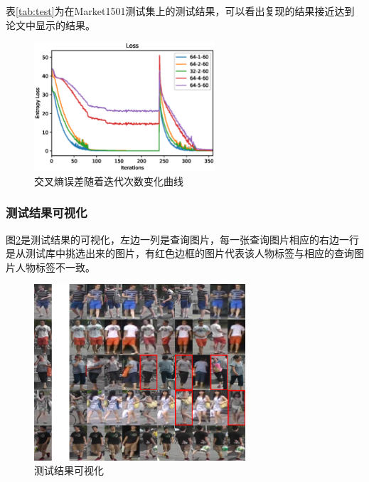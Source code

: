 表\ref{tab:test}为在Market1501测试集上的测试结果，可以看出复现的结果接近达到论文中显示的结果。

\begin{figure}[]
\centering
\includegraphics[width=0.6\textwidth]{figure/loss}
\caption{交叉熵误差随着迭代次数变化曲线}
\label{fig:loss}
\end{figure}

\subsubsection{测试结果可视化}

图\ref{fig:testvis}是测试结果的可视化，左边一列是查询图片，每一张查询图片相应的右边一行是从测试库中挑选出来的图片，有红色边框的图片代表该人物标签与相应的查询图片人物标签不一致。

\begin{figure}
\centering
\includegraphics[width=0.7\textwidth]{figure/vis3}
\caption{测试结果可视化}
\label{fig:testvis}
\end{figure}

